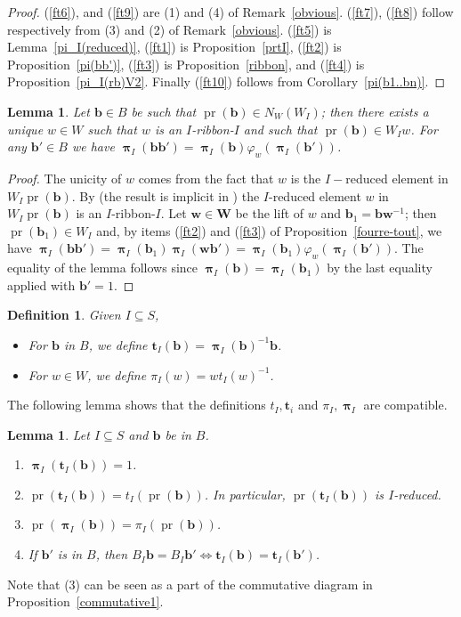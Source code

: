 \documentclass{amsart}
\numberwithin{equation}{section}
\newtheorem{lemma}[equation]{Lemma}
\newtheorem{definition}[equation]{Definition}
\newcommand\inv{^{-1}}
\newcommand\bb{{\mathbf b}}
\newcommand\bt{{\mathbf t}}
\newcommand\bw{{\mathbf w}}
\newcommand\bW{{\mathbf W}}
\DeclareMathOperator\pr{pr}
\DeclareMathOperator\bpi{\boldsymbol\pi}
\begin{document}
\begin{proof} (\ref{ft6}),  and (\ref{ft9}) are (1) and (4) of 
Remark~\ref{obvious}. (\ref{ft7}), (\ref{ft8}) follow respectively from 
(3) and (2) of Remark~\ref{obvious}. (\ref{ft5}) is Lemma~\ref{pi_I(reduced)},
(\ref{ft1}) is Proposition~\ref{prtI}, (\ref{ft2}) is Proposition~\ref{pi(bb')}, (\ref{ft3}) is
Proposition~\ref{ribbon}, and (\ref{ft4}) is Proposition~\ref{pi_I(rb)V2}.
Finally (\ref{ft10}) follows from Corollary~\ref{pi(b1..bn)}.
\end{proof}
\begin{lemma}\label{mult2}   Let  $\bb\in  B$  be  such  that  $\pr(\bb)\in
N_W(W_I)$;  then there exists a unique $w\in W$ such that $w$  is
an $I$-ribbon-$I$ and such that
$\pr(\bb)\in W_I w$.  For any $\bb'\in B$ we have
$\bpi_I(\bb\bb')=\bpi_I(\bb)\varphi_w(\bpi_I(\bb'))$.
\end{lemma}
\begin{proof} The unicity of $w$ comes from the fact that $w$ is the
$I-$reduced element in $W_I\pr(\bb)$.
By \cite[Lemme 6.1.7]{digne-michel} (the result is implicit in \cite{Brink-Howlett})
the $I$-reduced element $w$ in $W_I\pr(\bb)$ is an $I$-ribbon-$I$. Let $\bw\in \bW$ be
the lift of $w$ and $\bb_1=\bb\bw\inv$; then $\pr(\bb_1)\in W_I$ and, 
by items (\ref{ft2}) and (\ref{ft3}) of Proposition~\ref{fourre-tout}, we have
$\bpi_I(\bb\bb')=\bpi_I(\bb_1)\bpi_I(\bw\bb')=\bpi_I(\bb_1) \varphi_w(\bpi_I(\bb'))$.
The equality of the lemma
follows since  $\bpi_I(\bb)=\bpi_I(\bb_1)$ by the last equality applied with
$\bb'=1$.
\end{proof}
\begin{definition}\label{tailInArtinGroup} Given $I\subseteq S$,
\begin{itemize}
\item \index{tI@$\bt_I$}
For $\bb$ in $B$, we define $\bt_I(\bb)=\bpi_I(\bb)\inv\bb$.
\item
For $w\in W$, we define  $\pi_I(w)=w t_I(w)\inv$.
\end{itemize}
\end{definition}
The following lemma shows that the definitions $t_I,\bt_i$ and $\pi_I,\bpi_I$
are compatible.
\begin{lemma} \label{Icoset}
Let $I\subseteq S$ and $\bb$ be in $B$. 
\begin{enumerate}
\item  $\bpi_I(\bt_I(\bb))=1$.
\item $\pr(\bt_I(\bb))=t_I(\pr(\bb))$. In particular, $\pr(\bt_I(\bb))$  is $I$-reduced.
\item $\pr(\bpi_I(\bb))=\pi_I(\pr(\bb))$.
\item If $\bb'$ is in $B$, then $B_I\bb = B_I\bb'\iff \bt_I(\bb) = \bt_I(\bb')$.
\end{enumerate}
\end{lemma} 
Note that (3) can be  seen as a  part of the commutative diagram in Proposition~\ref{commutative1}.  
\end{document}
